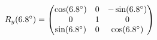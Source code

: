 \documentclass[preview]{standalone}
\begin{document}
\begin{align*}
\special{dvisvgm:raw <g id='unique000'>}R_y(6.8^\circ) = \begin{pmatrix} \cos(6.8^\circ) & 0 & -\sin(6.8^\circ) \\ 0 & 1 & 0 \\ \sin(6.8^\circ) & 0 & \cos(6.8^\circ) \end{pmatrix}\special{dvisvgm:raw </g>}
\end{align*}
\end{document}
